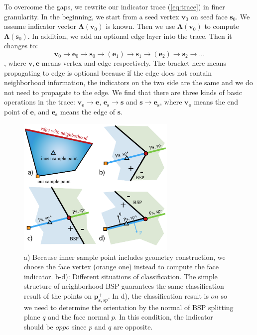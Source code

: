 \documentclass[10pt,journal,compsoc]{IEEEtran}
\begin{document}
To overcome the gaps, we rewrite our indicator trace (\ref{eq:trace}) in finer granularity. In the beginning, we start from a seed vertex $\bm{v}_0$ on seed face $\bm{s}_0$. We assume indicator vector $\bm{\Lambda}(\bm{v}_0)$ is known. Then we use $\bm{\Lambda}(\bm{v}_0)$ to compute $\bm{\Lambda}(\bm{s}_0)$. In addition, we add an optional edge layer into the trace. Then it changes to:
\begin{equation}
\bm{v}_0\to \bm{e}_0\to \bm{s}_0\to (\bm{e}_1)\to \bm{s}_1\to (\bm{e}_2)\to \bm{s}_2\to ...
\end{equation}
, where $\bm{v}, \bm{e}$ means vertex and edge respectively. The bracket here means propagating to edge is optional because if the edge does not contain neighborhood information, the indicators on the two side are the same and we do not need to propagate to the edge. We find that there are three kinds of basic operations in the trace: $\bm{v}_{\bm{e}}\to \bm{e}$, $\bm{e}_{\bm{s}}\to \bm{s}$ and $\bm{s}\to \bm{e}_{\bm{s}}$, where $\bm{v}_{\bm{e}}$ means the end point of $\bm{e}$, and $\bm{e}_{\bm{s}}$ means the edge of $\bm{s}$.

\begin{figure}[t]
\centering
\includegraphics[width=3in]{bsps}
\caption{a) Because inner sample point includes geometry construction, we choose the face vertex (orange one) instead to compute the face indicator. b-d): Different situations of classification. The simple structure of neighborhood BSP guarantees the same classification result of the points on $\bm{p}_{\bm{s}, sp}^+$. In d), the classification result is $on$ so we need to determine the orientation by the normal of BSP splitting plane $q$ and the face normal $p$. In this condition, the indicator should be $oppo$ since $p$ and $q$ are opposite.}
\label{fig:bsps}
\end{figure}
\end{document}
